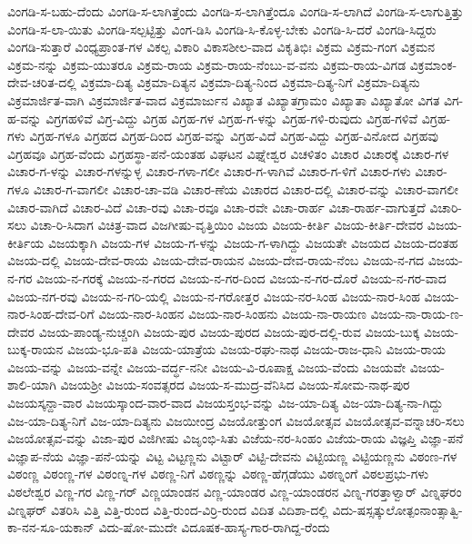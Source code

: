ವಿಂಗಡಿ-ಸ-ಬಹು-ದೆಂದು
ವಿಂಗಡಿ-ಸ-ಲಾಗಿತ್ತೆಂದು
ವಿಂಗಡಿ-ಸ-ಲಾಗಿತ್ತೆಂದೂ
ವಿಂಗಡಿ-ಸ-ಲಾಗಿದೆ
ವಿಂಗಡಿ-ಸ-ಲಾಗುತ್ತಿತ್ತು
ವಿಂಗಡಿ-ಸ-ಲಾ-ಯಿತು
ವಿಂಗಡಿ-ಸಲ್ಪಟ್ಟಿತ್ತು
ವಿಂಗ-ಡಿಸಿ
ವಿಂಗಡಿ-ಸಿ-ಕೊಳ್ಳ-ಬೇಕು
ವಿಂಗಡಿ-ಸಿ-ದರೆ
ವಿಂಗಡಿ-ಸಿದ್ದರು
ವಿಂಗಡಿ-ಸುತ್ತಾರೆ
ವಿಂಧ್ಯಪ್ರಾಂತ-ಗಳ
ವಿಕಲ್ಪ
ವಿಕಾರಿ
ವಿಕಾಸಶೀಲ-ವಾದ
ವಿಕೃತಿಭಿಃ
ವಿಕ್ರಮ
ವಿಕ್ರಮ-ಗಂಗ
ವಿಕ್ರಮನ
ವಿಕ್ರಮ-ನನ್ನು
ವಿಕ್ರಮ-ಯುತರೂ
ವಿಕ್ರಮ-ರಾಯ
ವಿಕ್ರಮ-ರಾಯ-ನೆಂಬು-ವ-ವನು
ವಿಕ್ರಮ-ರಾಯ-ವಿಗಡ
ವಿಕ್ರಮಾಂಕ-ದೇವ-ಚರಿತ-ದಲ್ಲಿ
ವಿಕ್ರಮಾ-ದಿತ್ಯ
ವಿಕ್ರಮಾ-ದಿತ್ಯನ
ವಿಕ್ರಮಾ-ದಿತ್ಯ-ನಿಂದ
ವಿಕ್ರಮಾ-ದಿತ್ಯ-ನಿಗೆ
ವಿಕ್ರಮಾ-ದಿತ್ಯನು
ವಿಕ್ರಮಾರ್ಜಿತ-ವಾಗಿ
ವಿಕ್ರಮಾರ್ಜಿತ-ವಾದ
ವಿಕ್ರಮಾರ್ಜುನ
ವಿಖ್ಯಾತ
ವಿಖ್ಯಾತಗ್ರಾಮಂ
ವಿಖ್ಯಾತಾ
ವಿಖ್ಯಾತೋ
ವಿಗತ
ವಿಗ-ಹ-ವನ್ನು
ವಿಗ್ರಗಹಳಿವೆ
ವಿಗ್ರ-ವಿದ್ದು
ವಿಗ್ರಹ
ವಿಗ್ರಹ-ಗಳ
ವಿಗ್ರಹ-ಗ-ಳನ್ನು
ವಿಗ್ರಹ-ಗಳಿ-ರುವುದು
ವಿಗ್ರಹ-ಗಳಿವೆ
ವಿಗ್ರಹ-ಗಳು
ವಿಗ್ರಹ-ಗಳೂ
ವಿಗ್ರಹದ
ವಿಗ್ರಹ-ದಿಂದ
ವಿಗ್ರಹ-ವನ್ನು
ವಿಗ್ರಹ-ವಿದೆ
ವಿಗ್ರಹ-ವಿದ್ದು
ವಿಗ್ರಹ-ವಿನೋದ
ವಿಗ್ರಹವು
ವಿಗ್ರಹವೂ
ವಿಗ್ರಹ-ವೆಂದು
ವಿಗ್ರಹಸ್ಥಾ-ಪನೆ-ಯಂತಹ
ವಿಘಟನ
ವಿಘ್ನೇಶ್ವರ
ವಿಚಳಿತಂ
ವಿಚಾರ
ವಿಚಾರಕ್ಕೆ
ವಿಚಾರ-ಗಳ
ವಿಚಾರ-ಗ-ಳನ್ನು
ವಿಚಾರ-ಗಳನ್ನುಳ್ಳ
ವಿಚಾರ-ಗಳಾ-ಗಲೀ
ವಿಚಾರ-ಗ-ಳಾಗಿವೆ
ವಿಚಾರ-ಗ-ಳಿಗೆ
ವಿಚಾರ-ಗಳು
ವಿಚಾರ-ಗಳೂ
ವಿಚಾರ-ಗ-ವಾಗಲೀ
ವಿಚಾರ-ಚಾ-ವಡಿ
ವಿಚಾರ-ಣೆಯ
ವಿಚಾರದ
ವಿಚಾರ-ದಲ್ಲಿ
ವಿಚಾರ-ವನ್ನು
ವಿಚಾರ-ವಾಗಲೀ
ವಿಚಾರ-ವಾಗಿದೆ
ವಿಚಾರ-ವಿದೆ
ವಿಚಾ-ರವು
ವಿಚಾ-ರವೂ
ವಿಚಾ-ರವೇ
ವಿಚಾ-ರಾರ್ಹ
ವಿಚಾ-ರಾರ್ಹ-ವಾಗುತ್ತದೆ
ವಿಚಾರಿ-ಸಲು
ವಿಚಾ-ರಿ-ಸಿದಾಗ
ವಿಚಿತ್ರ-ವಾದ
ವಿಜಗೀಷು-ವೃತ್ತಿಯಿಂ
ವಿಜಯ
ವಿಜಯ-ಕೀರ್ತಿ
ವಿಜಯ-ಕೀರ್ತಿ-ದೇವರ
ವಿಜಯ-ಕೀರ್ತಿಯ
ವಿಜಯಕ್ಕಾಗಿ
ವಿಜಯ-ಗಳ
ವಿಜಯ-ಗ-ಳನ್ನು
ವಿಜಯ-ಗ-ಳಾಗಿದ್ದು
ವಿಜಯತೇ
ವಿಜಯದ
ವಿಜಯ-ದಂತಹ
ವಿಜಯ-ದಲ್ಲಿ
ವಿಜಯ-ದೇವ-ರಾಯ
ವಿಜಯ-ದೇವ-ರಾಯನ
ವಿಜಯ-ದೇವ-ರಾಯ-ನೆಂಬ
ವಿಜಯ-ನ-ಗದ
ವಿಜಯ-ನ-ಗರ
ವಿಜಯ-ನ-ಗರಕ್ಕೆ
ವಿಜಯ-ನ-ಗರದ
ವಿಜಯ-ನ-ಗರ-ದಿಂದ
ವಿಜಯ-ನ-ಗರ-ದೊರೆ
ವಿಜಯ-ನ-ಗರ-ವಾದ
ವಿಜಯ-ನಗ-ರವು
ವಿಜಯ-ನ-ಗರಿ-ಯಲ್ಲಿ
ವಿಜಯ-ನ-ಗರೋತ್ತರ
ವಿಜಯ-ನರ-ಸಿಂಹ
ವಿಜಯ-ನಾರ-ಸಿಂಹ
ವಿಜಯ-ನಾರ-ಸಿಂಹ-ದೇವ-ರಿಗೆ
ವಿಜಯ-ನಾರ-ಸಿಂಹನ
ವಿಜಯ-ನಾರ-ಸಿಂಹನು
ವಿಜಯ-ನಾ-ರಾಯಣ
ವಿಜಯ-ನಾ-ರಾಯ-ಣ-ದೇವರ
ವಿಜಯ-ಪಾಂಡ್ಯ-ನುಚ್ಚಂಗಿ
ವಿಜಯ-ಪುರ
ವಿಜಯ-ಪುರದ
ವಿಜಯ-ಪುರ-ದಲ್ಲಿ-ರುವ
ವಿಜಯ-ಬುಕ್ಕ
ವಿಜಯ-ಬುಕ್ಕ-ರಾಯನ
ವಿಜಯ-ಭೂ-ಪತಿ
ವಿಜಯ-ಯಾತ್ರೆಯ
ವಿಜಯ-ರಘು-ನಾಥ
ವಿಜಯ-ರಾಜ-ಧಾನಿ
ವಿಜಯ-ರಾಯ
ವಿಜಯ-ವನ್ನು
ವಿಜಯ-ವನ್ನೇ
ವಿಜಯ-ವರ್ದ್ಧ-ನನೀ
ವಿಜಯ-ವಿ-ರೂಪಾಕ್ಷ
ವಿಜಯ-ವೆಂದು
ವಿಜಯವೇ
ವಿಜಯ-ಶಾಲಿ-ಯಾಗಿ
ವಿಜಯಶ್ರೀ
ವಿಜಯ-ಸಂವತ್ಸರದ
ವಿಜಯ-ಸ-ಮುದ್ರ-ವೆನಿಸಿದ
ವಿಜಯ-ಸೋಮ-ನಾಥ-ಪುರ
ವಿಜಯಸ್ಕನ್ದಾ-ವಾರ
ವಿಜಯಸ್ಕಾಂದ-ವಾರ-ವಾದ
ವಿಜಯಸ್ತಂಭ-ವನ್ನು
ವಿಜ-ಯಾ-ದಿತ್ಯ
ವಿಜ-ಯಾ-ದಿತ್ಯ-ನಾ-ಗಿದ್ದು
ವಿಜ-ಯಾ-ದಿತ್ಯ-ನಿಗೆ
ವಿಜ-ಯಾ-ದಿತ್ಯನು
ವಿಜಯೀಂದ್ರ
ವಿಜಯೋತ್ತುಂಗ
ವಿಜಯೋತ್ಸವ
ವಿಜಯೋತ್ಸವ-ವನ್ನಾಚರಿ-ಸಲು
ವಿಜಯೋತ್ಸವ-ವನ್ನು
ವಿಜಾ-ಪುರ
ವಿಜಿಗೀಷು
ವಿಜೃಂಭಿ-ಸಿತು
ವಿಜೆಯ-ನರ-ಸಿಂಹಂ
ವಿಜೆಯ-ರಾಯ
ವಿಜ್ಞಪ್ತಿ
ವಿಜ್ಞಾ-ಪನೆ
ವಿಜ್ಞಾಪ-ನೆಯ
ವಿಜ್ಞಾ-ಪನೆ-ಯನ್ನು
ವಿಟ್ಟ
ವಿಟ್ಟಣ್ಣನು
ವಿಟ್ಟಾರ್
ವಿಟ್ಟಿ-ದೇವನು
ವಿಟ್ಟಿಯಣ್ಣ
ವಿಟ್ಟಿಯಣ್ಣನು
ವಿಠಂಣ-ಗಳ
ವಿಠಂಣ್ಣ
ವಿಠಂಣ್ಣ-ಗಳ
ವಿಠಂಣ್ನ-ಗಳ
ವಿಠಣ್ಣ-ನಿಗೆ
ವಿಠಣ್ಣನ್ನು
ವಿಠಣ್ಣ-ಹೆಗ್ಗಡೆಯು
ವಿಠಣ್ನಂಗೆ
ವಿಠಲಪ್ರಭು-ಗಳು
ವಿಠಲೇಶ್ವರ
ವಿಣ್ಣ-ಗರ
ವಿಣ್ಣ-ಗರ್
ವಿಣ್ಣಯಾಂಡನ
ವಿಣ್ಣ-ಯಾಂಡರ
ವಿಣ್ಣ-ಯಾಂಡರನ
ವಿಣ್ನ-ಗರತ್ತಾಳ್ವಾರ್
ವಿಣ್ನಘರಂ
ವಿಣ್ನಘರ್
ವಿತರಿಸಿ
ವಿತ್ತಿ
ವಿತ್ತಿ-ರುಂದ
ವಿತ್ತಿ-ರುಂದ-ವಿರ್ರಿ-ರುಂದ
ವಿದಿತ
ವಿದಿಶಾ-ದಲ್ಲಿ
ವಿದು-ಷಸ್ಸತ್ಕುಲೋತ್ಪಂನಾಂತ್ಸಾತ್ವಿ-ಕಾ-ನನ-ಸೂ-ಯಕಾನ್
ವಿದು-ಷೋ-ಮುದೇ
ವಿದೂಷಕ-ಹಾಸ್ಯ-ಗಾರ-ರಾಗಿದ್ದ-ರೆಂದು
